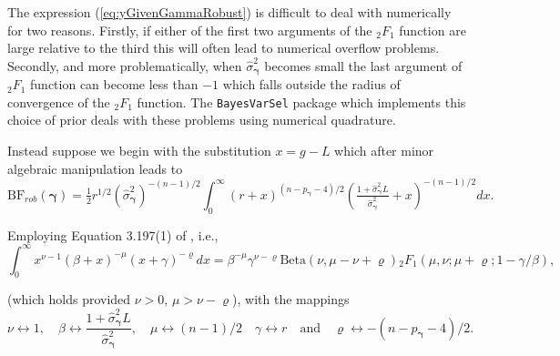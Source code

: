 \documentclass[12pt]{article}
\def\vectorfonttwo{\boldsymbol}
\def\vgamma{{\vectorfonttwo \gamma}}             %
\def\ds{\displaystyle}
\begin{document}
The expression (\ref{eq:yGivenGammaRobust}) is difficult to deal with numerically for two reasons. Firstly, if either of the first 
two arguments of the ${}_2F_1$ function are large relative to the third this will often lead to numerical overflow problems. Secondly,
and more problematically, when $\widehat{\sigma}_\vgamma^2$ becomes small the last argument
of ${}_2F_1$ function can become less than $-1$ which falls outside the radius of convergence
of the ${}_2F_1$ function. The {\tt BayesVarSel} package which implements
this choice of prior deals with these problems using numerical
quadrature.
 
Instead suppose we begin with the substitution $x = g - L$ which after minor algebraic manipulation
leads to
$$
\ds \mbox{BF}_{{rob}}(\vgamma)
= \tfrac{1}{2} r^{1/2} \left( \widehat{\sigma}_\vgamma^2\right)^{-(n-1)/2} 
\int_0^\infty  (r + x)^{(n - p_\vgamma-4)/2}
\left(  \tfrac{1 +  \widehat{\sigma}_\vgamma^2L}{\widehat{\sigma}_\vgamma^2} +  x \right)^{-(n-1)/2} dx.
$$

\noindent Employing Equation 3.197(1) of \cite{Gradshteyn2007}, i.e.,
$$
\int_0^\infty x^{\nu - 1}(\beta + x)^{-\mu}(x + \gamma)^{-\varrho} dx
= \beta^{-\mu}
\gamma^{\nu - \varrho} 
\mbox{Beta}(\nu,\mu - \nu + \varrho)
{}_2F_1(\mu,\nu;\mu+\varrho; 1 - \gamma/\beta),
$$

\noindent (which holds provided $\nu>0$, $\mu > \nu - \varrho$), with the mappings
$$
\nu \leftrightarrow 1,
\quad 
\beta \leftrightarrow \frac{1 +  \widehat{\sigma}_\vgamma^2L}{\widehat{\sigma}_\vgamma^2},
\quad 
\mu \leftrightarrow (n-1)/2
\quad 
\gamma \leftrightarrow r
\quad \mbox{and} \quad 
\varrho \leftrightarrow -(n - p_\vgamma-4)/2.
$$
\end{document}
